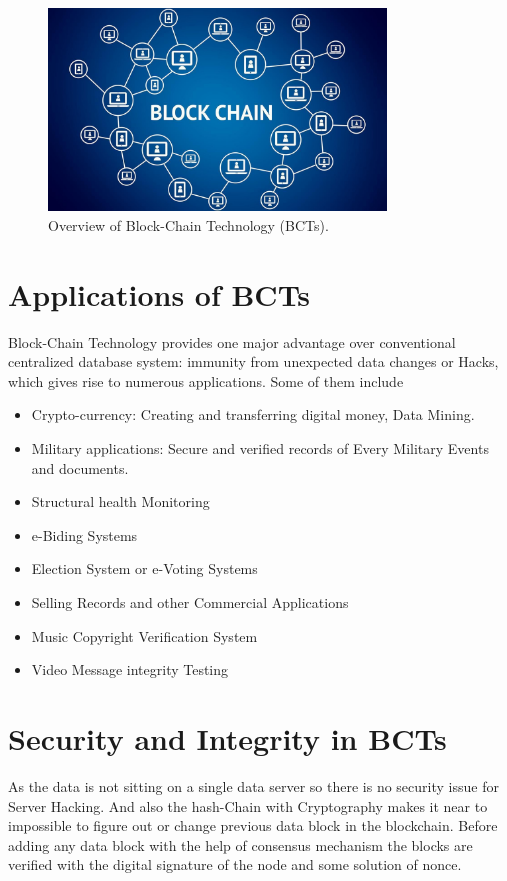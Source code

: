 \documentclass[a4paper,12pt]{report}
\begin{document}
\begin{figure}
\begin{center}
\includegraphics[width=0.8\textwidth]{blockchain.jpeg}
\end{center}
\caption{Overview of Block-Chain Technology (BCTs).}
\end{figure}

\section{Applications of BCTs}
Block-Chain Technology provides one major advantage over conventional centralized database system: immunity from unexpected data changes or Hacks, which gives rise to numerous applications. Some of them include

\begin{itemize}
\item Crypto-currency: Creating and transferring digital money, Data Mining.
\item Military applications: Secure and verified records of Every Military Events and documents.
\item Structural health Monitoring
\item e-Biding Systems
\item Election System or e-Voting Systems
\item Selling Records and other Commercial Applications
\item Music Copyright Verification System
\item Video Message integrity Testing
\end{itemize}

\section{Security and Integrity in BCTs}
As the data is not sitting on a single data server so there is no security issue for Server Hacking. And also the hash-Chain with Cryptography makes it near to impossible to figure out or change previous data block in the blockchain. Before adding any data block with the help of consensus mechanism the blocks are verified with the digital signature of the node and some solution of nonce.
\end{document}
